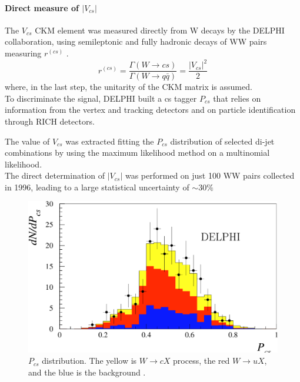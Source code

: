 \vspace{-0.85cm}
\paragraph*{Direct measure of $|V_{cs}|$}
The $V_{cs}$ CKM element was measured directly from W decays by the DELPHI collaboration, using semileptonic and fully hadronic decays of WW pairs measuring $r^{(cs)}$ \cite{Abreu1998MeasurementLEP2}.
\vspace{-0.5cm}
\begin{equation}
    r^{(cs)}=\frac{\Gamma(W\to cs)}{\Gamma(W\to q\bar{q})}=\frac{|V_{cs}|^2}{2}
\end{equation}
where, in the last step, the unitarity of the CKM matrix is assumed.\\
To discriminate the signal, DELPHI built a cs tagger $P_{cs}$ that relies on information from the vertex and tracking detectors and on particle identification through RICH detectors.\\
\begin{minipage}{\linewidth}
\begin{minipage}{0.4\linewidth}
    \vspace{-1cm}
    The value of $V_{cs}$ was extracted fitting the $P_{cs}$ distribution of selected di-jet combinations by using the maximum likelihood method on a multinomial likelihood.
    \\
    The direct determination of $|V_{cs}|$ was performed on just 100 WW pairs collected in 1996, leading to a large statistical uncertainty of $\sim 30\%$\\
\end{minipage}
\hfill
\begin{minipage}{0.58\linewidth}
    \begin{figure}[H]
        \centering
        \includegraphics[width=\linewidth]{fig//chap02-theory/delphi.png}
        \caption{$P_{cs}$ distribution. The yellow is $W\to cX$ process, the red $W\to uX$, and the blue is the background \cite{Abreu1998MeasurementLEP2}.}
        \label{fig:enter-label}
    \end{figure}
\end{minipage}
\end{minipage}

